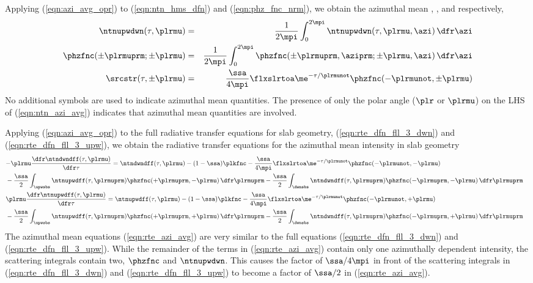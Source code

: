 \documentclass[12pt]{article}
\begin{document}
Applying (\ref{eqn:azi_avg_opr}) to (\ref{eqn:ntn_hms_dfn}) and
(\ref{eqn:phz_fnc_nrm}), we obtain the azimuthal mean
, , and
 respectively, 
\begin{eqnarray}
\label{eqn:ntn_azi_avg}
\ntnupwdwn(\tau,\plrmu) & = & \frac{1}{2\mpi} \int_{0}^{2\mpi} 
\ntnupwdwn(\tau,\plrmu,\azi) \,\dfr\azi \\
\label{eqn:phz_fnc_azi_avg}
\phzfnc(\pm\plrmuprm;\pm\plrmu) & = & \frac{1}{2\mpi} \int_{0}^{2\mpi}
\phzfnc(\pm\plrmuprm,\aziprm;\pm\plrmu,\azi) \,\dfr\azi \\
\label{eqn:src_str_azi_avg}
\srcstr(\tau,\pm\plrmu) & = &
\frac{\ssa}{4\mpi} \flxslrtoa \me^{-\tau/\plrmunot}
\phzfnc(-\plrmunot,\pm\plrmu)
\end{eqnarray}
No additional symbols are used to indicate azimuthal mean quantities.
The presence of only the polar angle ($\plr$ or $\plrmu$) on the LHS 
of (\ref{eqn:ntn_azi_avg}) indicates that azimuthal mean quantities
are involved. 

Applying (\ref{eqn:azi_avg_opr}) to the full radiative transfer
equations for slab geometry, 
(\ref{eqn:rte_dfn_fll_3_dwn}) and (\ref{eqn:rte_dfn_fll_3_upw}), 
we obtain the radiative transfer equations for the azimuthal mean
intensity in slab geometry
\begin{subequations}
\label{eqn:rte_azi_avg}
\begin{align}
\label{eqn:rte_azi_avg_dwn}
\lefteqn{ - \plrmu \frac{\dfr\ntndwndff(\tau,\plrmu)}{\dfr\tau} = 
\ntndwndff(\tau,\plrmu) - (1-\ssa) \plkfnc - 
\frac{\ssa}{4\mpi} \flxslrtoa \me^{-\tau/\plrmunot}
\phzfnc(-\plrmunot,-\plrmu) }
\nonumber \\ & {} %
- \frac{\ssa}{2} \int_{\upwsbs} \ntnupwdff(\tau,\plrmuprm) 
\phzfnc(+\plrmuprm,-\plrmu) \,\dfr\plrmuprm
- \frac{\ssa}{2} \int_{\dwnsbs} \ntndwndff(\tau,\plrmuprm) 
\phzfnc(-\plrmuprm,-\plrmu) \,\dfr\plrmuprm \\
\label{eqn:rte_azi_avg_upw}
\lefteqn{ \plrmu \frac{\dfr\ntnupwdff(\tau,\plrmu)}{\dfr\tau} =  
\ntnupwdff(\tau,\plrmu) - (1-\ssa) \plkfnc -
\frac{\ssa}{4\mpi} \flxslrtoa \me^{-\tau/\plrmunot}
\phzfnc(-\plrmunot,+\plrmu) }
\nonumber \\ & {} %
- \frac{\ssa}{2} \int_{\upwsbs} \ntnupwdff(\tau,\plrmuprm) 
\phzfnc(+\plrmuprm,+\plrmu) \,\dfr\plrmuprm
- \frac{\ssa}{2} \int_{\dwnsbs} \ntndwndff(\tau,\plrmuprm) 
\phzfnc(-\plrmuprm,+\plrmu) \,\dfr\plrmuprm
\end{align}
\end{subequations} 
The azimuthal mean equations (\ref{eqn:rte_azi_avg}) are very similar
to the full equations (\ref{eqn:rte_dfn_fll_3_dwn}) and
(\ref{eqn:rte_dfn_fll_3_upw}). 
While the remainder of the terms in (\ref{eqn:rte_azi_avg}) contain
only one azimuthally dependent intensity, the scattering integrals
contain two, $\phzfnc$ and $\ntnupwdwn$.
This causes the factor of $\ssa/4\mpi$ in front of the scattering
integrals in (\ref{eqn:rte_dfn_fll_3_dwn}) and 
(\ref{eqn:rte_dfn_fll_3_upw}) to become a factor of $\ssa/2$
in (\ref{eqn:rte_azi_avg}).
\end{document}
